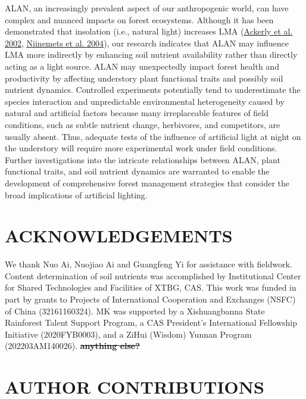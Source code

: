 \documentclass[
  12pt,
  letterpaper,
  DIV=11,
  numbers=noendperiod]{scrartcl}
\providecommand{\DIFdeltex}[1]{{\protect\color{red}\sout{#1}}}                      %
\providecommand{\DIFdelbegin}{} %
\providecommand{\DIFdelend}{} %
\providecommand{\DIFdel}[1]{\texorpdfstring{\DIFdeltex{#1}}{}} %
\newcommand{\DIFscaledelfig}{0.5}
\newlength{\DIFdelgraphicswidth} %
\newlength{\DIFdelgraphicsheight} %
\newcommand{\DIFdelincludegraphics}[2][]{%
\sbox{\DIFdelgraphicsbox}{\DIFOincludegraphics[#1]{#2}}%
\settoboxwidth{\DIFdelgraphicswidth}{\DIFdelgraphicsbox} %
\settoboxtotalheight{\DIFdelgraphicsheight}{\DIFdelgraphicsbox} %
\scalebox{\DIFscaledelfig}{%
\parbox[b]{\DIFdelgraphicswidth}{\usebox{\DIFdelgraphicsbox}\\[-\baselineskip] \rule{\DIFdelgraphicswidth}{0em}}\llap{\resizebox{\DIFdelgraphicswidth}{\DIFdelgraphicsheight}{%
\setlength{\unitlength}{\DIFdelgraphicswidth}%
\begin{picture}(1,1)%
\thicklines\linethickness{2pt} %
{\color[rgb]{1,0,0}\put(0,0){\framebox(1,1){}}}%
{\color[rgb]{1,0,0}\put(0,0){\line( 1,1){1}}}%
{\color[rgb]{1,0,0}\put(0,1){\line(1,-1){1}}}%
\end{picture}%
}\hspace*{3pt}}} %
} %
\DeclareRobustCommand{\DIFdelbegin}{\DIFOdelbegin \let\includegraphics\DIFdelincludegraphics} %
\DeclareRobustCommand{\DIFdelend}{\DIFOaddend \let\includegraphics\DIFOincludegraphics} %
\begin{document}
ALAN, an increasingly prevalent aspect of our anthropogenic world, can
have complex and nuanced impacts on forest ecosystems. Although it has
been demonstrated that insolation (i.e., natural light) increases LMA
(\protect\hyperlink{ref-Ackerly2002}{Ackerly et al. 2002},
\protect\hyperlink{ref-Niinemets2004}{Niinemets et al. 2004}), our
research indicates that ALAN may influence LMA more indirectly by
enhancing soil nutrient availability rather than directly acting as a
light source. ALAN may unexpectedly impact forest health and
productivity by affecting understory plant functional traits and
possibly soil nutrient dynamics. Controlled experiments potentially tend
to underestimate the species interaction and unpredictable environmental
heterogeneity caused by natural and artificial factors because many
irreplaceable features of field conditions, such as subtle nutrient
change, herbivores, and competitors, are usually absent. Thus, adequate
tests of the influence of artificial light at night on the understory
will require more experimental work under field conditions. Further
investigations into the intricate relationships between ALAN, plant
functional traits, and soil nutrient dynamics are warranted to enable
the development of comprehensive forest management strategies that
consider the broad implications of artificial lighting.

\hypertarget{acknowledgements}{%
\section{ACKNOWLEDGEMENTS}\label{acknowledgements}}

We thank Nuo Ai, Nuojiao Ai and Guangfeng Yi for assistance with
fieldwork. Content determination of soil nutrients was accomplished by
Institutional Center for Shared Technologies and Facilities of XTBG,
CAS. This work was funded in part by grants to Projects of International
Cooperation and Exchanges (NSFC) of China (32161160324). MK was
supported by a Xishuangbanna State Rainforest Talent Support Program, a
CAS President's International Fellowship Initiative (2020FYB0003), and a
ZiHui (Wisdom) Yunnan Program (202203AM140026).
\DIFdelbegin \textbf{\DIFdel{anything else?}}
\DIFdelend 

\hypertarget{author-contributions}{%
\section{AUTHOR CONTRIBUTIONS}\label{author-contributions}}
\end{document}
